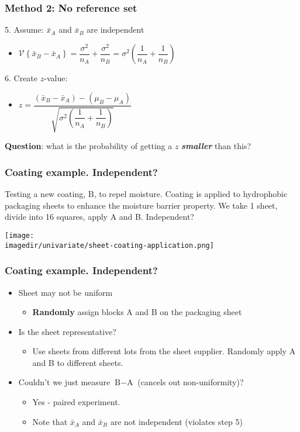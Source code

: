 \begin{frame}\frametitle{Method 2: No reference set}

	5. Assume: $\bar{x}_A$ and $\bar{x}_B$ are independent
	\begin{itemize}
		\item $\mathcal{V}\left\{\bar{x}_B - \bar{x}_A\right\} = \dfrac{\sigma^2}{n_A} + \dfrac{\sigma^2}{n_B} = \sigma^2 \left(\dfrac{1}{n_A} + \dfrac{1}{n_B}\right)$
	\end{itemize}

	6. Create $z$-value:
	\begin{itemize}
		\item $z = \dfrac{(\bar{x}_B - \bar{x}_A) - (\mu_B - \mu_A)}{\sqrt{\sigma^2 \left(\dfrac{1}{n_A} + \dfrac{1}{n_B}\right)}}$
	\end{itemize}

	\textbf{Question}: what is the probability of getting a $z$ \textbf{\emph{smaller}} than this?
\end{frame}

\begin{frame}\frametitle{Coating example. Independent?}

	Testing a new coating, B, to repel moisture. Coating is applied to hydrophobic packaging sheets to enhance the moisture barrier property. We take 1 sheet, divide into 16 squares, apply A and B. Independent?
	\begin{center}
		\texttt{[image: \\imagedir/univariate/sheet-coating-application.png]}
	\end{center}
\end{frame}

\begin{frame}\frametitle{Coating example. Independent?}
	\begin{itemize}
		\item Sheet may not be uniform
		\begin{itemize}
			\item \textbf{Randomly} assign blocks A and B on the packaging sheet \pause
		\end{itemize}
		\item Is the sheet representative?
		\begin{itemize}
			\item Use sheets from different lots from the sheet supplier. Randomly apply A and B to different sheets. \pause
		\end{itemize}
		\item Couldn't we just measure $\text{B} - \text{A}$ (cancels out non-uniformity)?
		\begin{itemize}
			\item Yes - paired experiment.
			\item Note that $\bar{x}_A$ and $\bar{x}_B$ are not independent (violates step 5)
		\end{itemize}
	\end{itemize}
\end{frame}

